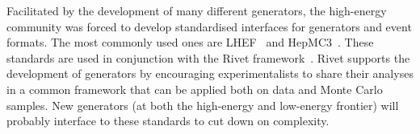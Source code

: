 Facilitated by the development of many different generators, the high-energy community was forced to develop standardised interfaces for generators and event formats.
The most commonly used ones are LHEF~\cite{Alwall:2006yp} and HepMC3~\cite{Buckley:2019xhk}.
These standards are used in conjunction with the {\sc Rivet} framework~\cite{Bierlich:2019rhm}.
{\sc Rivet} supports the development of generators by encouraging experimentalists to share their analyses in a common framework that can be applied both on data and Monte Carlo samples.
New generators (at both the high-energy and low-energy frontier) will probably interface to these standards to cut down on complexity.

